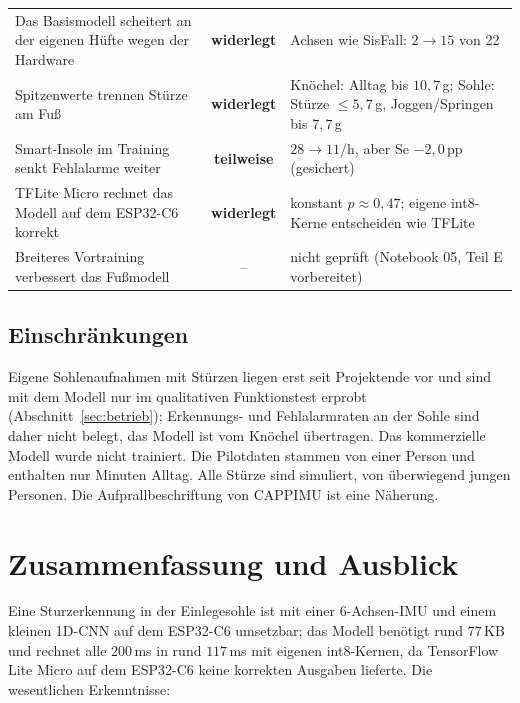 \documentclass[11pt,a4paper,oneside,parskip=half,open=any,
               numbers=noenddot,listof=totoc,bibliography=totoc]{scrreprt}
\newcommand{\nein}{\textcolor{thmrot}{\textbf{widerlegt}}}
\newcommand{\teils}{\textcolor{thmgrau}{\textbf{teilweise}}}
\begin{document}
\begin{table}[H]
\begin{tabularx}{\textwidth}{>{\raggedright\arraybackslash}p{5.6cm} c Y}
Das Basismodell scheitert an der eigenen Hüfte wegen der Hardware & \nein & Achsen wie SisFall: $2 \rightarrow 15$ von 22 \\
Spitzenwerte trennen Stürze am Fuß & \nein & Knöchel: Alltag bis $10{,}7$\,g; Sohle: Stürze $\leq 5{,}7$\,g, Joggen/Springen bis $7{,}7$\,g \\
Smart-Insole im Training senkt Fehlalarme weiter & \teils & $28 \rightarrow 11$/h, aber Se $-2{,}0$\,pp (gesichert) \\
TFLite Micro rechnet das Modell auf dem ESP32-C6 korrekt & \nein & konstant $p \approx 0{,}47$; eigene int8-Kerne entscheiden wie TFLite \\
Breiteres Vortraining verbessert das Fußmodell & -- & nicht geprüft (Notebook 05, Teil E vorbereitet) \\
\bottomrule
\end{tabularx}
\end{table}

\section{Einschränkungen}
Eigene Sohlenaufnahmen mit Stürzen liegen erst seit Projektende vor
und sind mit dem Modell nur im qualitativen Funktionstest erprobt
(Abschnitt~\ref{sec:betrieb}); Erkennungs- und Fehlalarmraten an der
Sohle sind daher nicht belegt, das Modell ist vom Knöchel übertragen.
Das kommerzielle Modell wurde nicht trainiert. Die
Pilotdaten stammen von einer Person und enthalten nur Minuten Alltag.
Alle Stürze sind simuliert, von überwiegend jungen Personen. Die
Aufprallbeschriftung von CAPPIMU ist eine Näherung.

\chapter{Zusammenfassung und Ausblick}
\label{ch:fazit}
Eine Sturzerkennung in der Einlegesohle ist mit einer 6-Achsen-IMU und
einem kleinen 1D-CNN auf dem ESP32-C6 umsetzbar; das Modell benötigt
rund $77$\,KB und rechnet alle $200$\,ms in rund $117$\,ms mit eigenen
int8-Kernen, da TensorFlow Lite Micro auf dem ESP32-C6 keine korrekten
Ausgaben lieferte. Die wesentlichen Erkenntnisse:
\end{document}
